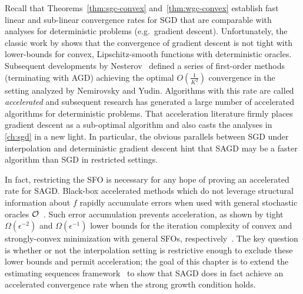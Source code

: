 Recall that Theorems~\ref{thm:sgc-convex} and~\ref{thm:wgc-convex} establish fast linear and sub-linear convergence rates for \ac{SGD} that are comparable with analyses for deterministic problems (e.g.\ gradient descent).
Unfortunately, the classic work by \citet{nemirovsky1983problem} shows that the convergence of gradient descent is not tight with lower-bounds for convex, Lipschitz-smooth functions with deterministic oracles. 
Subsequent developments by Nesterov~\citep{nesterov1983method, nemirovsky1985optimal, nesterov1988approach} defined a series of first-order methods (terminating with \ac{AGD}) achieving the optimal \( O(\frac{1}{K^2}) \) convergence in the setting analyzed by Nemirovsky and Yudin. 
Algorithms with this rate are called \emph{accelerated} and subsequent research has generated a large number of accelerated algorithms for deterministic problems.
That acceleration literature firmly places gradient descent as a sub-optimal algorithm and also casts the analyses in \autoref{ch:sgd} in a new light.
In particular, the obvious parallels between \ac{SGD} under interpolation and deterministic gradient descent hint that \ac{SAGD} may be a faster algorithm than \ac{SGD} in restricted settings. 

In fact, restricting the \ac{SFO} is necessary for any hope of proving an accelerated rate for \ac{SAGD}.
Black-box accelerated methods which do not leverage structural information about \( f \) rapidly accumulate errors when used with general stochastic oracles \( \oracle{} \)~\citep{devolder2014first, schmidt2011convergence}. 
Such error accumulation prevents acceleration, as shown by tight \( \Omega(\epsilon^{-2}) \) and \( \Omega(\epsilon^{-1}) \) lower bounds for the iteration complexity of convex and strongly-convex minimization with general \acp{SFO}, respectively~\citep{nemirovsky1983problem, agarwal2012information, raginsky2011information}.
The key question is whether or not the interpolation setting is restrictive enough to exclude these lower bounds and permit acceleration;
the goal of this chapter is to extend the estimating sequences framework~\citep{nesterov2004lectures} to show that \ac{SAGD} does in fact achieve an accelerated convergence rate when the strong growth condition holds.

